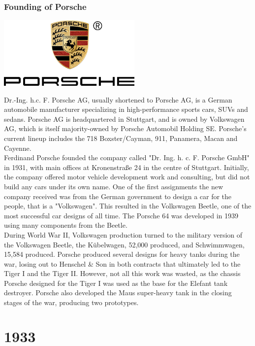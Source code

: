 \documentclass[11pt]{report}
\begin{document}
\subsection{Founding of Porsche}
\vspace{2mm}\begin{center}\includegraphics[width=7cm]{./img/porscheLogo.jpg}\end{center}
Dr.-Ing. h.c. F. Porsche AG, usually shortened to Porsche AG, is a German automobile manufacturer specializing in high-performance sports cars, SUVs and sedans. Porsche AG is headquartered in Stuttgart, and is owned by Volkswagen AG, which is itself majority-owned by Porsche Automobil Holding SE. Porsche's current lineup includes the 718 Boxster/Cayman, 911, Panamera, Macan and Cayenne.\\ 
\indent Ferdinand Porsche founded the company called "Dr. Ing. h. c. F. Porsche GmbH" in 1931, with main offices at Kronenstraße 24 in the centre of Stuttgart. Initially, the company offered motor vehicle development work and consulting, but did not build any cars under its own name. One of the first assignments the new company received was from the German government to design a car for the people, that is a "Volkswagen". This resulted in the Volkswagen Beetle, one of the most successful car designs of all time. The Porsche 64 was developed in 1939 using many components from the Beetle.\\
\indent During World War II, Volkswagen production turned to the military version of the Volkswagen Beetle, the Kübelwagen, 52,000 produced, and Schwimmwagen, 15,584 produced. Porsche produced several designs for heavy tanks during the war, losing out to Henschel \& Son in both contracts that ultimately led to the Tiger I and the Tiger II. However, not all this work was wasted, as the chassis Porsche designed for the Tiger I was used as the base for the Elefant tank destroyer. Porsche also developed the Maus super-heavy tank in the closing stages of the war, producing two prototypes.

\chapter{1933}
\end{document}

